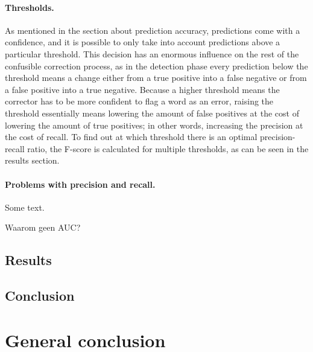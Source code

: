 \documentclass[12pt]{article}
\let\stdsection\section
\renewcommand\section{\newpage\stdsection}
\begin{document}

\paragraph{Thresholds.} As mentioned in the section about prediction accuracy, predictions come with a confidence, and it is possible to only take into account predictions above a particular threshold. This decision has an enormous influence on the rest of the confusible correction process, as in the detection phase every prediction below the threshold means a change either from a true positive into a false negative or from a false positive into a true negative. Because a higher threshold means the corrector has to be more confident to flag a word as an error, raising the threshold essentially means lowering the amount of false positives at the cost of lowering the amount of true positives; in other words, increasing the precision at the cost of recall. To find out at which threshold there is an optimal precision-recall ratio, the F-score is calculated for multiple thresholds, as can be seen in the results section.

\paragraph{Problems with precision and recall.} Some text.

Waarom geen AUC?

\subsection{Results}

\subsection{Conclusion}

\section{General conclusion}%
\end{document}
